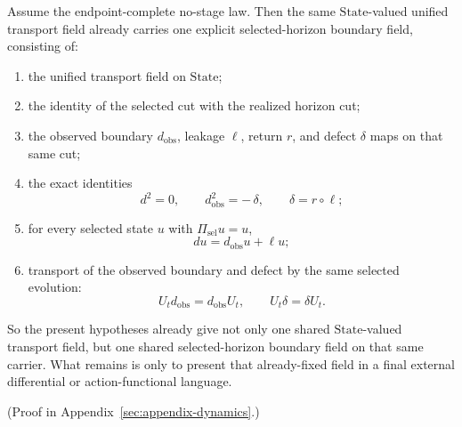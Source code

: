 \begin{corollary}
\label{cor:endpoint-complete-no-stage-law-already-yields-one-unified-boundary-field}
Assume the endpoint-complete no-stage law. Then the same
\(\mathrm{State}\)-valued unified transport field already carries one explicit
selected-horizon boundary field, consisting of:
\begin{enumerate}[label=(\roman*), leftmargin=2em, itemsep=0.2em]
\item the unified transport field on \(\mathrm{State}\);
\item the identity of the selected cut with the realized horizon cut;
\item the observed boundary \(d_{\mathrm{obs}}\), leakage \(\ell\), return
      \(r\), and defect \(\delta\) maps on that same cut;
\item the exact identities
      \[
      d^2 = 0,\qquad
      d_{\mathrm{obs}}^2 = -\,\delta,\qquad
      \delta = r \circ \ell;
      \]
\item for every selected state \(u\) with \(\Pi_{\mathrm{sel}}u=u\),
      \[
      d u = d_{\mathrm{obs}}u + \ell u;
      \]
\item transport of the observed boundary and defect by the same selected
      evolution:
      \[
      U_t d_{\mathrm{obs}} = d_{\mathrm{obs}} U_t,\qquad
      U_t \delta = \delta U_t.
      \]
\end{enumerate}
So the present hypotheses already give not only one shared
\(\mathrm{State}\)-valued transport field, but one shared selected-horizon
boundary field on that same carrier. What remains is only to present that
already-fixed field in a final external differential or action-functional
language.
\end{corollary}

(Proof in Appendix~\ref{sec:appendix-dynamics}.)


